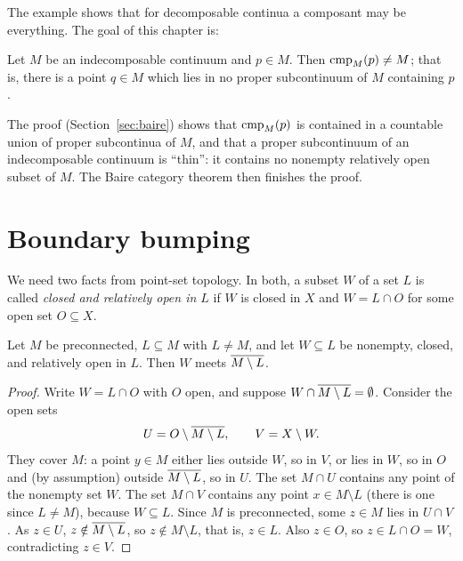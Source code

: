 The example shows that for decomposable continua a composant may be everything. The goal of
this chapter is:

\begin{theorem}\label{thm:composant-proper}
Let $M$ be an indecomposable continuum and $p\in M$. Then $\operatorname{cmp}_{M}(p)\neq M$; that is, there is a
point $q\in M$ which lies in no proper subcontinuum of $M$ containing $p$.
\end{theorem}

The proof (Section~\ref{sec:baire}) shows that $\operatorname{cmp}_{M}(p)$ is contained in a countable union of
proper subcontinua of $M$, and that a proper subcontinuum of an indecomposable continuum is
``thin'': it contains no nonempty relatively open subset of $M$. The Baire category theorem
then finishes the proof.

\section{Boundary bumping}

We need two facts from point-set topology. In both, a subset $W$ of a set $L$ is called
\emph{closed and relatively open in $L$} if $W$ is closed in $X$ and $W=L\cap O$ for some open
set $O\subseteq X$.

\begin{lemma}\label{lem:bumping}
Let $M$ be preconnected, $L\subseteq M$ with $L\neq M$, and let $W\subseteq L$ be nonempty, closed,
and relatively open in $L$. Then $W$ meets $\overline{M\setminus L}$.
\end{lemma}

\begin{proof}
Write $W=L\cap O$ with $O$ open, and suppose $W\cap\overline{M\setminus L}=\emptyset$. Consider the open
sets
\[
U=O\setminus\overline{M\setminus L},\qquad V=X\setminus W .
\]
They cover $M$: a point $y\in M$ either lies outside $W$, so in $V$, or lies in $W$, so in $O$ and
(by assumption) outside $\overline{M\setminus L}$, so in $U$. The set $M\cap U$ contains any point of the
nonempty set $W$. The set $M\cap V$ contains any point $x\in M\setminus L$ (there is one since
$L\neq M$), because $W\subseteq L$. Since $M$ is preconnected, some $z\in M$ lies in $U\cap V$. As
$z\in U$, $z\notin\overline{M\setminus L}$, so $z\notin M\setminus L$, that is, $z\in L$. Also $z\in O$,
so $z\in L\cap O=W$, contradicting $z\in V$.
\end{proof}


